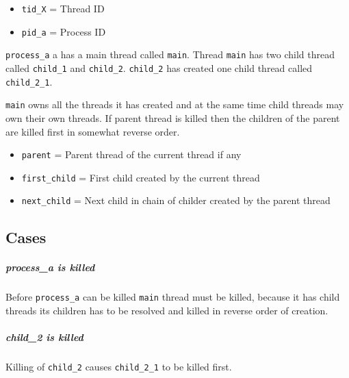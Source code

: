 \begin{itemize}
  \item \verb+tid_X+ = Thread ID
  \item \verb+pid_a+ = Process ID
\end{itemize}

\verb+process_a+ a has a main thread called \verb+main+. Thread \verb+main+ has
two child thread called \verb+child_1+ and \verb+child_2+. \verb+child_2+ has
created one child thread called \verb+child_2_1+.

\verb+main+ owns all the threads it has created and at the same time child threads
may own their own threads. If parent thread is killed then the children of the
parent are killed first in somewhat reverse order.

\begin{itemize}
  \item \verb+parent+ = Parent thread of the current thread if any
  \item \verb+first_child+ = First child created by the current thread
  \item \verb+next_child+ = Next child in chain of childer created by the parent thread
\end{itemize}

\subsection{Cases}
\subparagraph*{process_a is killed}

Before \verb+process_a+ can be killed \verb+main+ thread must be killed,
because it has child threads its children has to be resolved and killed in
reverse order of creation.

\subparagraph*{child_2 is killed}

Killing of \verb+child_2+ causes \verb+child_2_1+ to be killed first.

